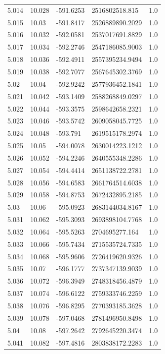 \begin{tabular}{lllll}
5.014 & 10.028 & -591.6253 & 2516802518.815 & 1.0 \\
5.015 & 10.03 & -591.8417 & 2526889890.2029 & 1.0 \\
5.016 & 10.032 & -592.0581 & 2537017691.8829 & 1.0 \\
5.017 & 10.034 & -592.2746 & 2547186085.9003 & 1.0 \\
5.018 & 10.036 & -592.4911 & 2557395234.9494 & 1.0 \\
5.019 & 10.038 & -592.7077 & 2567645302.3769 & 1.0 \\
5.02 & 10.04 & -592.9242 & 2577936452.1841 & 1.0 \\
5.021 & 10.042 & -593.1409 & 2588268849.0297 & 1.0 \\
5.022 & 10.044 & -593.3575 & 2598642658.2321 & 1.0 \\
5.023 & 10.046 & -593.5742 & 2609058045.7725 & 1.0 \\
5.024 & 10.048 & -593.791 & 2619515178.2974 & 1.0 \\
5.025 & 10.05 & -594.0078 & 2630014223.1212 & 1.0 \\
5.026 & 10.052 & -594.2246 & 2640555348.2286 & 1.0 \\
5.027 & 10.054 & -594.4414 & 2651138722.2781 & 1.0 \\
5.028 & 10.056 & -594.6583 & 2661764514.6038 & 1.0 \\
5.029 & 10.058 & -594.8753 & 2672432895.2185 & 1.0 \\
5.03 & 10.06 & -595.0923 & 2683144034.8167 & 1.0 \\
5.031 & 10.062 & -595.3093 & 2693898104.7768 & 1.0 \\
5.032 & 10.064 & -595.5263 & 2704695277.164 & 1.0 \\
5.033 & 10.066 & -595.7434 & 2715535724.7335 & 1.0 \\
5.034 & 10.068 & -595.9606 & 2726419620.9326 & 1.0 \\
5.035 & 10.07 & -596.1777 & 2737347139.9039 & 1.0 \\
5.036 & 10.072 & -596.3949 & 2748318456.4879 & 1.0 \\
5.037 & 10.074 & -596.6122 & 2759333746.2259 & 1.0 \\
5.038 & 10.076 & -596.8295 & 2770393185.3628 & 1.0 \\
5.039 & 10.078 & -597.0468 & 2781496950.8498 & 1.0 \\
5.04 & 10.08 & -597.2642 & 2792645220.3474 & 1.0 \\
5.041 & 10.082 & -597.4816 & 2803838172.2283 & 1.0 \\

\end{tabular}

